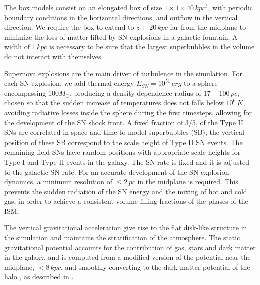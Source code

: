 \documentclass[12pt,a4paper]{article}
\begin{document}
The box models consist on an elongated box of size $1 \times 1 \times 40 \, kpc^{3}$, with periodic boundary conditions in the horizontal directions, and outflow in the vertical direction.
We require the box to extend to $z \pm \, 20 \, kpc$ far from the midplane to minimize the loss of matter lifted by SN explosions in a galactic fountain. 
A width of $1 \, kpc$ is necessary to be sure that the largest superbubbles in the volume do not interact with themselves.
	
Supernova explosions are the main driver of turbulence in the simulation.
For each SN explosion, we add thermal energy $E_{SN} = 10^{51} \, erg$ to a sphere encompassing $100 M_{\odot}$, producing a density dependence radius of $17-100 \, pc$, chosen so that the sudden increase of temperatures does not falls below $10^{6} \, K$, avoiding radiative losses inside the sphere during the first timesteps, allowing for the development of the SN shock front. 
A fixed fraction of 3/5, of the Type II SNs are correlated in space and time to model superbubbles (SB), the vertical position of these SB correspond to the scale height of Type II SN events.
The remaining field SNs have random positions with appropriate scale heights for Type I and Type II events in the galaxy.
The SN rate is fixed and it is adjusted to the galactic SN rate.
For an accurate development of the SN explosion dynamics, a minimum resolution of $\leqslant 2 \, pc$ in the midplane is required. 
This prevents the sudden radiation of the SN energy and the mixing of hot and cold gas, in order to achieve a consistent volume filling fractions of the phases of the ISM.
	
The vertical gravitational acceleration give rise to the flat disk-like structure in the simulation and maintains the stratification of the atmosphere.
The static gravitational potential accounts for the contribution of gas, stars and dark matter in the galaxy, and is computed from a modified version of the \citet{Kuijken&Gilmore1989} potential near the midplane, $< 8 \, kpc$, and smoothly converting to the dark matter potential of the halo \citep{NFW}, as described in \citet{Hill2012}.
	
\end{document}
